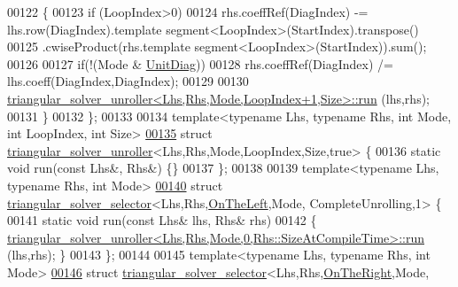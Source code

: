 \begin{DoxyCode}
00122   \{
00123     \textcolor{keywordflow}{if} (LoopIndex>0)
00124       rhs.coeffRef(DiagIndex) -= lhs.row(DiagIndex).template segment<LoopIndex>(StartIndex).transpose()
00125                                 .cwiseProduct(rhs.template segment<LoopIndex>(StartIndex)).sum();
00126 
00127     \textcolor{keywordflow}{if}(!(Mode & \hyperlink{group__enums_gga39e3366ff5554d731e7dc8bb642f83cdaddb72f888ac85d5a1c52333e54f9374b}{UnitDiag}))
00128       rhs.coeffRef(DiagIndex) /= lhs.coeff(DiagIndex,DiagIndex);
00129 
00130     \hyperlink{struct_eigen_1_1internal_1_1triangular__solver__unroller}{triangular\_solver\_unroller<Lhs,Rhs,Mode,LoopIndex+1,Size>::run}
      (lhs,rhs);
00131   \}
00132 \};
00133 
00134 \textcolor{keyword}{template}<\textcolor{keyword}{typename} Lhs, \textcolor{keyword}{typename} Rhs, \textcolor{keywordtype}{int} Mode, \textcolor{keywordtype}{int} LoopIndex, \textcolor{keywordtype}{int} Size>
\hyperlink{struct_eigen_1_1internal_1_1triangular__solver__unroller_3_01_lhs_00_01_rhs_00_01_mode_00_01_loo770c06e8f4c15ef547184369307ea3d8}{00135} \textcolor{keyword}{struct }\hyperlink{struct_eigen_1_1internal_1_1triangular__solver__unroller}{triangular\_solver\_unroller}<Lhs,Rhs,Mode,LoopIndex,Size,true> \{
00136   \textcolor{keyword}{static} \textcolor{keywordtype}{void} run(\textcolor{keyword}{const} Lhs&, Rhs&) \{\}
00137 \};
00138 
00139 \textcolor{keyword}{template}<\textcolor{keyword}{typename} Lhs, \textcolor{keyword}{typename} Rhs, \textcolor{keywordtype}{int} Mode>
\hyperlink{struct_eigen_1_1internal_1_1triangular__solver__selector_3_01_lhs_00_01_rhs_00_01_on_the_left_00d738951dca8e27ae91ede40ea882f73c}{00140} \textcolor{keyword}{struct }\hyperlink{struct_eigen_1_1internal_1_1triangular__solver__selector}{triangular\_solver\_selector}<Lhs,Rhs,\hyperlink{group__enums_ggac22de43beeac7a78b384f99bed5cee0ba129609b3bdf23b071f5f86cf2f995ec4}{OnTheLeft},Mode,
      CompleteUnrolling,1> \{
00141   \textcolor{keyword}{static} \textcolor{keywordtype}{void} run(\textcolor{keyword}{const} Lhs& lhs, Rhs& rhs)
00142   \{ \hyperlink{struct_eigen_1_1internal_1_1triangular__solver__unroller}{triangular\_solver\_unroller<Lhs,Rhs,Mode,0,Rhs::SizeAtCompileTime>::run}
      (lhs,rhs); \}
00143 \};
00144 
00145 \textcolor{keyword}{template}<\textcolor{keyword}{typename} Lhs, \textcolor{keyword}{typename} Rhs, \textcolor{keywordtype}{int} Mode>
\hyperlink{struct_eigen_1_1internal_1_1triangular__solver__selector_3_01_lhs_00_01_rhs_00_01_on_the_right_0718422e7095664eb478cc4024fd5b399}{00146} \textcolor{keyword}{struct }\hyperlink{struct_eigen_1_1internal_1_1triangular__solver__selector}{triangular\_solver\_selector}<Lhs,Rhs,\hyperlink{group__enums_ggac22de43beeac7a78b384f99bed5cee0ba99dc75d8e00b6c3a5bdc31940f47492b}{OnTheRight},Mode,

\end{DoxyCode}
